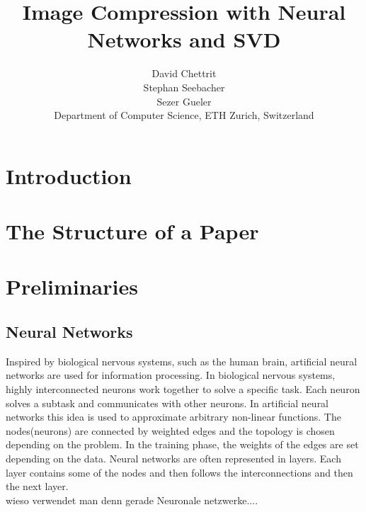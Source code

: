 \documentclass[10pt,conference,compsocconf]{IEEEtran}
\begin{document}
\title{Image Compression with Neural Networks and SVD}

\author{
  David Chettrit\\
  Stephan Seebacher\\
  Sezer Gueler\\
  Department of Computer Science, ETH Zurich, Switzerland
}




\maketitle

\begin{abstract}

\end{abstract}

\section{Introduction}



\section{The Structure of a Paper}
\label{sec:structure-paper}



\section{Preliminaries}
\label{sec:tips-writing}

\subsection{Neural Networks}
Inspired by biological nervous systems, such as the human brain, artificial neural networks are used for information processing. In biological nervous systems, highly interconnected neurons work together to solve a specific task. Each neuron solves a subtask and communicates with other neurons. In artificial neural networks this idea is used to approximate arbitrary  non-linear functions. The nodes(neurons) are connected by weighted edges and the topology is chosen depending on the problem. In the training phase, the weights of the edges are set depending on the data. Neural networks are often represented in layers. Each layer contains some of the nodes and then follows the interconnections and then the next layer. 
\\
wieso verwendet man denn gerade Neuronale netzwerke....
\end{document}
